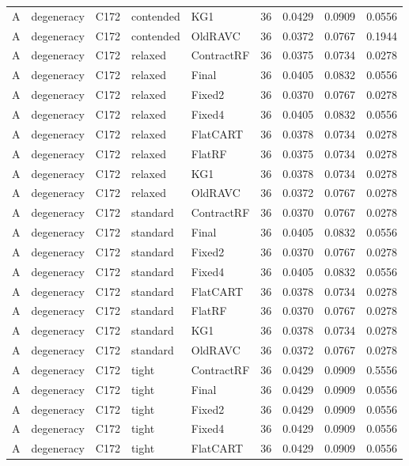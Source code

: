 \begin{longtable}{@{}lllllllll@{}}
A & degeneracy & C172 & contended & KG1 & 36 & 0.0429 & 0.0909 & 0.0556\\
A & degeneracy & C172 & contended & OldRAVC & 36 & 0.0372 & 0.0767 & 0.1944\\
A & degeneracy & C172 & relaxed & ContractRF & 36 & 0.0375 & 0.0734 & 0.0278\\
A & degeneracy & C172 & relaxed & Final & 36 & 0.0405 & 0.0832 & 0.0556\\
A & degeneracy & C172 & relaxed & Fixed2 & 36 & 0.0370 & 0.0767 & 0.0278\\
A & degeneracy & C172 & relaxed & Fixed4 & 36 & 0.0405 & 0.0832 & 0.0556\\
A & degeneracy & C172 & relaxed & FlatCART & 36 & 0.0378 & 0.0734 & 0.0278\\
A & degeneracy & C172 & relaxed & FlatRF & 36 & 0.0375 & 0.0734 & 0.0278\\
A & degeneracy & C172 & relaxed & KG1 & 36 & 0.0378 & 0.0734 & 0.0278\\
A & degeneracy & C172 & relaxed & OldRAVC & 36 & 0.0372 & 0.0767 & 0.0278\\
A & degeneracy & C172 & standard & ContractRF & 36 & 0.0370 & 0.0767 & 0.0278\\
A & degeneracy & C172 & standard & Final & 36 & 0.0405 & 0.0832 & 0.0556\\
A & degeneracy & C172 & standard & Fixed2 & 36 & 0.0370 & 0.0767 & 0.0278\\
A & degeneracy & C172 & standard & Fixed4 & 36 & 0.0405 & 0.0832 & 0.0556\\
A & degeneracy & C172 & standard & FlatCART & 36 & 0.0378 & 0.0734 & 0.0278\\
A & degeneracy & C172 & standard & FlatRF & 36 & 0.0370 & 0.0767 & 0.0278\\
A & degeneracy & C172 & standard & KG1 & 36 & 0.0378 & 0.0734 & 0.0278\\
A & degeneracy & C172 & standard & OldRAVC & 36 & 0.0372 & 0.0767 & 0.0278\\
A & degeneracy & C172 & tight & ContractRF & 36 & 0.0429 & 0.0909 & 0.5556\\
A & degeneracy & C172 & tight & Final & 36 & 0.0429 & 0.0909 & 0.0556\\
A & degeneracy & C172 & tight & Fixed2 & 36 & 0.0429 & 0.0909 & 0.0556\\
A & degeneracy & C172 & tight & Fixed4 & 36 & 0.0429 & 0.0909 & 0.0556\\
A & degeneracy & C172 & tight & FlatCART & 36 & 0.0429 & 0.0909 & 0.0556\\

\end{longtable}
